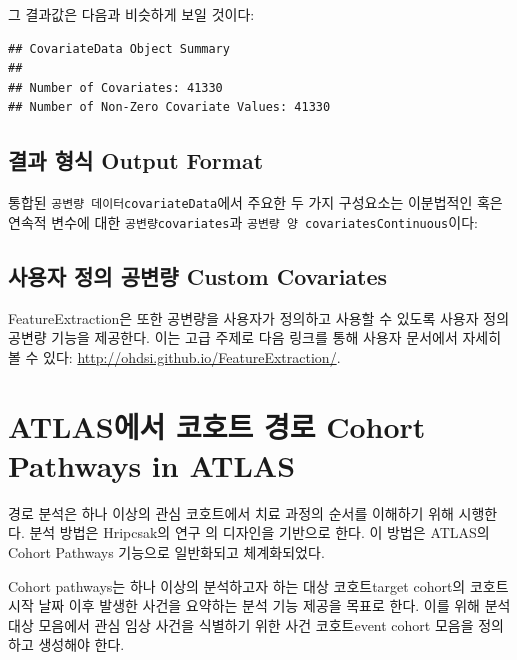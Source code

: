 \documentclass[10.5pt]{book}
\newenvironment{Shaded}{\begin{snugshade}}{\end{snugshade}}
\newcommand{\OperatorTok}[1]{\textcolor[rgb]{0.81,0.36,0.00}{\textbf{#1}}}
\newcommand{\NormalTok}[1]{#1}
\theoremstyle{definition}
\theoremstyle{definition}
\theoremstyle{definition}
\theoremstyle{remark}
\begin{document}
그 결과값은 다음과 비슷하게 보일 것이다:

\begin{verbatim}
## CovariateData Object Summary 
## 
## Number of Covariates: 41330 
## Number of Non-Zero Covariate Values: 41330
\end{verbatim}

\subsection{결과 형식 Output Format}\label{--output-format}

통합된 \texttt{공변량\ 데이터covariateData}에서 주요한 두 가지
구성요소는 이분법적인 혹은 연속적 변수에 대한
\texttt{공변량covariates}과
\texttt{공변량\ 양\ covariatesContinuous}이다:

\begin{Shaded}
\end{Shaded}

\subsection{사용자 정의 공변량 Custom
Covariates}\label{---custom-covariates}

FeatureExtraction은 또한 공변량을 사용자가 정의하고 사용할 수 있도록
사용자 정의 공변량 기능을 제공한다. 이는 고급 주제로 다음 링크를 통해
사용자 문서에서 자세히 볼 수 있다:
\url{http://ohdsi.github.io/FeatureExtraction/}.

\section{ATLAS에서 코호트 경로 Cohort Pathways in
ATLAS}\label{atlas---cohort-pathways-in-atlas}

경로 분석은 하나 이상의 관심 코호트에서 치료 과정의 순서를 이해하기 위해
시행한다. 분석 방법은 Hripcsak의 연구 \citep{Hripcsak7329} 의 디자인을
기반으로 한다. 이 방법은 ATLAS의 Cohort Pathways 기능으로 일반화되고
체계화되었다.

Cohort pathways는 하나 이상의 분석하고자 하는 대상 코호트target cohort의
코호트 시작 날짜 이후 발생한 사건을 요약하는 분석 기능 제공을 목표로
한다. 이를 위해 분석 대상 모음에서 관심 임상 사건을 식별하기 위한 사건
코호트event cohort 모음을 정의하고 생성해야 한다.
\end{document}
